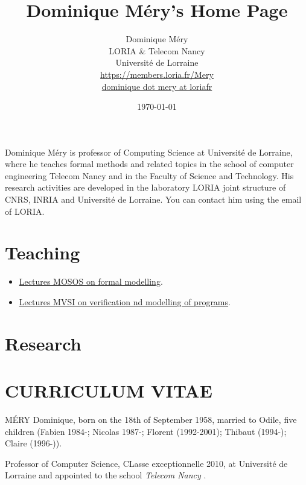 \documentclass[ 12pt]{article}
\title{Dominique Méry's Home Page}
\author{Dominique M\'ery\\
LORIA \& Telecom Nancy\\ Universit\'e de Lorraine\\
\url{https://members.loria.fr/Mery}\\ \url{dominique dot mery at loriafr}}
\date{\today}
\begin{document}
  \setcounter{ex}{1}
\maketitle





Dominique Méry is  professor of Computing Science at Université  de
Lorraine, where he teaches     formal methods and related topics    in the school of computer engineering
Telecom Nancy and in the Faculty of Science and Technology.  His
research activities are developed in the laboratory  LORIA joint
structure  of CNRS, INRIA and  Université de Lorraine.  You can
contact him  using the email of LORIA.

\tableofcontents

\section{Teaching}





\begin{itemize}

\item[] \href{https://mery54.github.io/teaching/mosos/}{Lectures MOSOS 
    on formal modelling}.


  \item[] \href{https://mery54.github.io/teaching/mvsi/}{Lectures MVSI 
    on  verification  nd modelling of programs}.


  
\end{itemize}

\section{Research}



\section{CURRICULUM VITAE}

\noindent
M\'ERY Dominique,  born on  the  18th of  September 1958,   married to
Odile, five   children     (Fabien 1984-; Nicolas    1987-;    Florent
(1992-2001); Thibaut (1994-); Claire (1996-)).

\noindent
Professor of Computer Science, CLasse exceptionnelle 2010,    at Universit\'e de Lorraine and appointed to the  school \textit{Telecom Nancy }.
\end{document}
